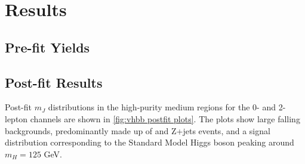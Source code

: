 \section{Results}\label{sec:vhbb_results}

\subsection{Pre-fit Yields}


\subsection{Post-fit Results}

Post-fit $m_J$ distributions in the high-purity medium \pTV regions for the 0- and 2-lepton channels are shown in \cref{fig:vhbb postfit plots}. The plots show large falling backgrounds, predominantly made up of \Wjets and Z+jets events, and a signal distribution corresponding to the Standard Model Higgs boson peaking around $m_H = 125$ GeV.

